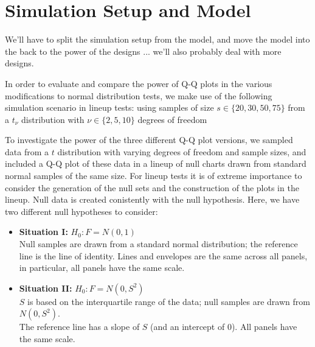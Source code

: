 \documentclass{article}\usepackage[]{graphicx}\usepackage[]{color}
\newcommand{\hh}[1]{{\color{magenta} #1}}
\begin{document}
\section{Simulation Setup and Model}\label{sec:simu}

\hh{We'll have to split the simulation setup from the model, and move the model into the back to the power of the designs ... we'll also probably deal with more designs. }

\hh{In order to evaluate and compare the power of Q-Q plots in the various modifications to normal distribution tests, we make use of the following simulation scenario in lineup tests:
using samples of size $s \in \{20, 30, 50, 75\}$ from a $t_\nu$ distribution with $\nu \in \{2, 5, 10\}$ degrees of freedom
}




To investigate the power of the three different Q-Q plot versions, we sampled data from a $t$ distribution with varying degrees of freedom and sample sizes, and included a Q-Q plot of these data in a lineup of null charts drawn from standard normal samples of the same size.
For lineup tests it is of extreme importance to consider the generation of the null sets and the construction of the plots in the lineup. 
Null data is created conistently with the null hypothesis. Here, we have two different null hypotheses to consider:

\begin{itemize}
\item{\bf Situation I:}
$H_0: F = N(0,1)$  \\
Null samples are drawn from a standard normal distribution; the reference line is the line of identity. Lines and envelopes are the same across all panels, in particular, all panels have the same scale. 
\item{\bf Situation II:} $H_0: F = N(0,S^2)$ \\
$S$ is based on the interquartile range of the data; null samples are drawn from $N(0, S^2)$. \\
The reference line has a slope of $S$ (and an intercept of 0).  All panels have the same scale. 
\end{itemize}
\end{document}
